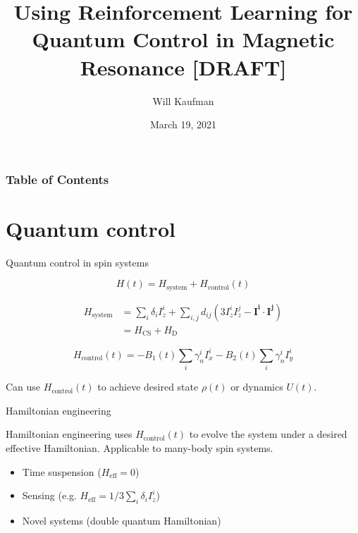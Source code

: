 \documentclass{beamer}
\title{Using Reinforcement Learning for Quantum Control in Magnetic Resonance [DRAFT]}
\author{Will Kaufman}
\date{March 19, 2021}
\institute{Ramanathan Group \\ Dartmouth College}
\begin{document}
\frame{\titlepage}

\begin{frame}
\frametitle{Table of Contents}
\tableofcontents
\end{frame}

\section{Quantum control}

\begin{frame}{Quantum control in spin systems}

\begin{equation*}
    H(t) = H_\text{system} + H_\text{control}(t)
\end{equation*}

\begin{align*}
    H_\text{system} &= \sum_i \delta_i I_z^i + \sum_{i,j} d_{ij} \left( 3I_z^iI_z^j - \mathbf{I^i} \cdot \mathbf{I^j} \right) \\
        &= H_\text{CS} + H_\text{D}
\end{align*}

\begin{equation*}
    H_\text{control}(t) = -B_1(t) \sum_i \gamma_n^i I_x^i -B_2(t) \sum_i \gamma_n^i I_y^i
\end{equation*}

Can use $H_\text{control}(t)$ to achieve desired state $\rho(t)$ or dynamics $U(t)$.

\end{frame}

\begin{frame}{Hamiltonian engineering}

Hamiltonian engineering uses $H_\text{control}(t)$ to evolve the system under a desired effective Hamiltonian. Applicable to many-body spin systems.

\begin{itemize}
    \item Time suspension ($H_\text{eff} = 0$)
    \item Sensing (e.g. $H_\text{eff} = 1/3 \sum_i \delta_i I_z^i$)
    \item Novel systems (double quantum Hamiltonian)
\end{itemize}

\end{frame}
\end{document}
